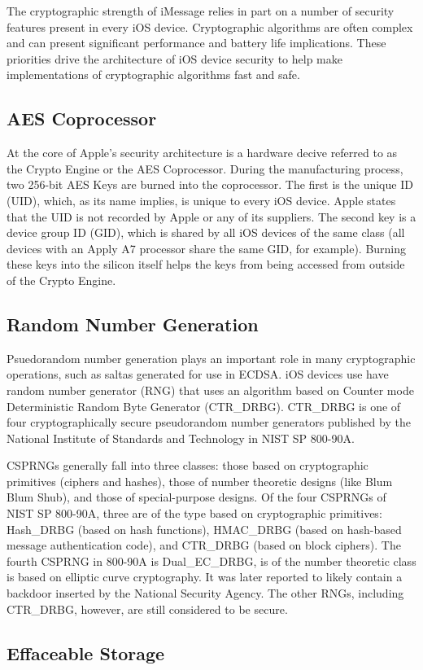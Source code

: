 The cryptographic strength of iMessage relies in part on a number of security
features present in every iOS device. Cryptographic algorithms are often
complex and can present significant performance and battery life implications.
These priorities drive the architecture of iOS device security to help make
implementations of cryptographic algorithms fast and safe.

\subsection{AES Coprocessor}
At the core of Apple's security architecture is a hardware decive referred to
as the Crypto Engine or the AES Coprocessor. During the manufacturing process,
two 256-bit AES Keys are burned into the coprocessor. The first is the unique
ID (UID), which, as its name implies, is unique to every iOS device. Apple
states that the UID is not recorded by Apple or any of its
suppliers\cite{apple}. The second key is a device group ID (GID), which is
shared by all iOS devices of the same class (all devices with an Apply A7
processor share the same GID, for example). Burning these keys into the silicon
itself helps the keys from being accessed from outside of the Crypto Engine.

\subsection{Random Number Generation}
Psuedorandom number generation plays an important role in many cryptographic
operations, such as saltas generated for use in ECDSA. iOS devices use have
random number generator (RNG) that uses an algorithm based on Counter mode
Deterministic Random Byte Generator (CTR\_DRBG).  CTR\_DRBG is one of four
cryptographically secure pseudorandom number generators published by the
National Institute of Standards and Technology in NIST SP
800-90A\cite{nistsp80090a}.

CSPRNGs generally fall into three classes: those based on cryptographic
primitives (ciphers and hashes), those of number theoretic designs (like Blum
Blum Shub), and those of special-purpose designs. Of the four CSPRNGs of NIST
SP 800-90A, three are of the type based on cryptographic primitives: Hash\_DRBG
(based on hash functions), HMAC\_DRBG (based on hash-based message
authentication code), and CTR\_DRBG (based on block ciphers). The fourth CSPRNG
in 800-90A is Dual\_EC\_DRBG, is of the number theoretic class is based on
elliptic curve cryptography. It was later reported to likely contain a backdoor
inserted by the National Security Agency\cite{goodin}. The other RNGs,
including CTR\_DRBG, however, are still considered to be secure.

\subsection{Effaceable Storage}
